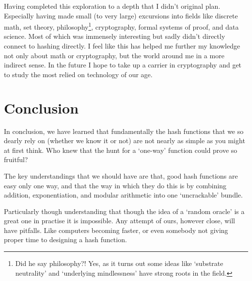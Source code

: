 \documentclass[11pt, oneside]{article}   	%
\begin{document}
Having completed this exploration to a depth that I didn’t original plan. Especially having made small (to very large) excursions into fields like discrete math, set theory, philosophy\footnote{Did he say philosophy?! Yes, as it turns out some ideas like ‘substrate neutrality’ and ‘underlying mindlessness’ have strong roots in the field.}, cryptography, formal systems of proof, and data science. Most of which was immensely interesting but sadly didn’t directly connect to hashing directly. I feel like this has helped me further my knowledge not only about math or cryptography, but the world around me in a more indirect sense. In the future I hope to take up a carrier in cryptography and get to study the most relied on technology of our age.

\section{Conclusion}
In conclusion, we have learned that fundamentally the hash functions that we so dearly rely on (whether we know it or not) are not nearly as simple as you might at first think. Who knew that the hunt for a ‘one-way’ function could prove so fruitful?

The key understandings that we should have are that, good hash functions are easy only one way, and that the way in which they do this is by combining addition, exponentiation, and modular arithmetic into one ‘uncrackable’ bundle.

Particularly though understanding that though the idea of a ‘random oracle’ is a great one in practise it is impossible. Any attempt of ours, however close, will have pitfalls. Like computers becoming faster, or even somebody not giving proper time to designing a hash function.
\end{document}
